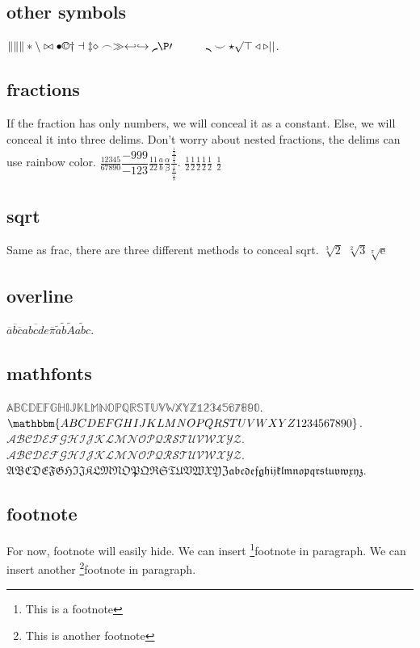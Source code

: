 \documentclass{ctexbook}
\begin{document}
\subsection{other symbols}
\(\| \lVert \rVert \ast \backslash \bowtie \bullet \copyright \dagger \dashv \ddagger \diamond \frown \gg \hookleftarrow \hookrightarrow \lmoustache \P \prime \quad \qquad \rmoustache \smile \star \surd \top \triangleleft \triangleright \lvert \rvert \).

\subsection{fractions}
If the fraction has only numbers, we will conceal it as a constant.
Else, we will conceal it into three delims. Don't worry about nested fractions, the delims can use rainbow color.
\(\frac{12345}{67890} \dfrac{-999}{-123} \tfrac{11}{22} \frac{a}{b} \frac{\alpha}{\beta} \frac{\frac{\frac{1}{2}}{\frac{3}{4}}}{\frac{\frac{5}{6}}{\frac{7}{8}}}\).
\(\frac {1}2 \frac {1} 2 \frac 1 2 \frac 12 \frac12\)
\(\frac1{2}\)
\subsection{sqrt}
Same as frac, there are three different methods to conceal sqrt.
\(\sqrt[3]{2}\)
\(\sqrt[2]{3}  \sqrt[\pi]{\mathrm{e}}\)
\subsection{overline}
\(\overline{a} \overline{b} \overline{c} \overline{abcde}  \overline{\pi} \tilde{a} \tilde{b} \tilde{A} \tilde{abc} \).

\subsection{mathfonts}
\(\mathbb{ABCDEFGHIJKLMNOPQRSTUVWXYZ1234567890} \).
\(\mathbbm{ABCDEFGHIJKLMNOPQRSTUVWXYZ1234567890} \).
\(\mathcal{ABCDEFGHIJKLMNOPQRSTUVWXYZ}\).
\(\mathscr{ABCDEFGHIJKLMNOPQRSTUVWXYZ}\).
\(\mathfrak{ABCDEFGHIJKLMNOPQRSTUVWXYZabcdefghijklmnopqrstuvwxyz}\).

\subsection{footnote}
For now, footnote will easily hide.
We can insert \footnote{This is a footnote}{footnote} in paragraph.
We can insert another \footnote{This is another footnote}{footnote} in paragraph.
\end{document}
